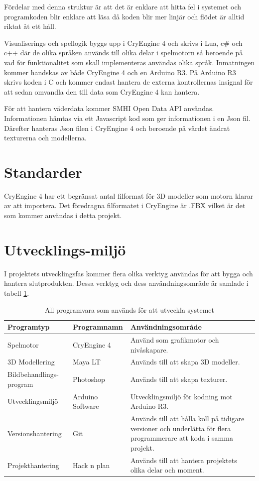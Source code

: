 \documentclass[a4paper,12pt,oneside,final]{extbook}
\begin{document}
Fördelar med denna struktur är att det är enklare att hitta fel i systemet och programkoden blir enklare att läsa då koden blir mer linjär och flödet är alltid riktat åt ett håll.

Visualiserings och spellogik byggs upp i CryEngine 4 och skrivs i Lua, c\# och c++ där de olika språken används till olika delar i spelmotorn så beroende på vad för funktionalitet som skall implementeras användas olika språk. Inmatningen kommer handskas av både CryEngine 4 och en Arduino R3. På Arduino R3 skrivs koden i C och kommer endast hantera de externa kontrollernas insignal för att sedan omvandla den till data som CryEngine 4 kan hantera.  

För att hantera väderdata kommer SMHI Open Data API\cite{SMHI} användas. Informationen hämtas via ett Javascript kod som ger informationen i en Json fil. Därefter hanteras Json filen i CryEngine 4 och beroende på värdet ändrat texturerna och modellerna.

\section{Standarder}
CryEngine 4 har ett begränsat antal filformat för 3D modeller som motorn klarar av att importera. Det föredragna filformatet i CryEngine är .FBX\cite{3Dmodel} vilket är det som kommer användas i detta projekt.

\section{Utvecklings-miljö}

I projektets utvecklingsfas kommer flera olika verktyg användas för att bygga och hantera slutprodukten. Dessa verktyg och dess användningsområde är samlade i tabell \ref{utvecklingsmiljö}. 


\begin{table}[H]
	\centering
	\caption{All programvara som används för att utveckla systemet}
	\label{utvecklingsmiljö}
	\begin{tabular}{ | p{9em} | m{6em} |p{23em}| } 
		\hline
		\textbf{Programtyp}&\textbf{Programnamn}  &\textbf{ Användningsområde} \\ 
		\hline
		Spelmotor &CryEngine 4 & Använd som grafikmotor och nivåskapare. \\ 
		\hline
		3D Modellering &Maya LT &Används till att skapa 3D modeller.  \\ 
		\hline
		Bildbehandlings-program &Photoshop&Används till att skapa texturer.  \\ 
		\hline
		Utvecklingsmiljö &Arduino Software &Utvecklingsmiljö för kodning mot Arduino R3.  \\ 
		\hline
		Versionshantering &Git &Används till att hålla koll på tidigare versioner och underlätta för flera programmerare att koda i samma projekt.  \\ 
		\hline
		Projekthantering &Hack n plan &Används till att hantera projektets olika delar och moment.  \\ 
		\hline

	\end{tabular}
\end{table}
\end{document}

